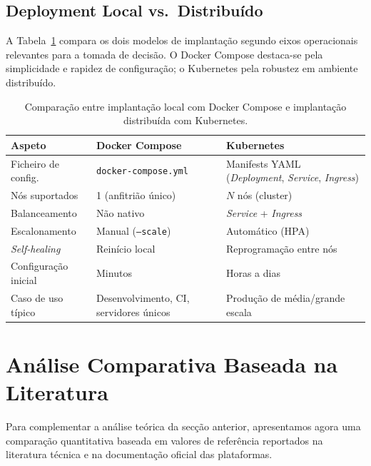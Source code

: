 \documentclass[conference]{IEEEtran}
\begin{document}
\subsection{Deployment Local vs.\ Distribuído}

A Tabela~\ref{tab:deploy} compara os dois modelos de implantação segundo eixos operacionais relevantes para a tomada de decisão. O Docker Compose destaca-se pela simplicidade e rapidez de configuração; o Kubernetes pela robustez em ambiente distribuído.

\begin{table}[t]
\caption{Comparação entre implantação local com Docker Compose e implantação distribuída com Kubernetes.}
\label{tab:deploy}
\centering
\renewcommand{\arraystretch}{1.15}
\footnotesize
\begin{tabular}{@{}p{2.0cm}p{2.6cm}p{2.6cm}@{}}
\toprule
\textbf{Aspeto} & \textbf{Docker Compose} & \textbf{Kubernetes} \\
\midrule
Ficheiro de config.\ & \texttt{docker-compose.yml} & Manifests YAML (\textit{Deployment}, \textit{Service}, \textit{Ingress}) \\
Nós suportados & 1 (anfitrião único) & $N$ nós (cluster) \\
Balanceamento & Não nativo & \textit{Service} + \textit{Ingress} \\
Escalonamento & Manual (\texttt{--scale}) & Automático (HPA) \\
\textit{Self-healing} & Reinício local & Reprogramação entre nós \\
Configuração inicial & Minutos & Horas a dias \\
Caso de uso típico & Desenvolvimento, CI, servidores únicos & Produção de média/grande escala \\
\bottomrule
\end{tabular}
\end{table}

\section{Análise Comparativa Baseada na Literatura}%

Para complementar a análise teórica da secção anterior, apresentamos agora uma comparação quantitativa baseada em valores de referência reportados na literatura técnica e na documentação oficial das plataformas.
\end{document}
